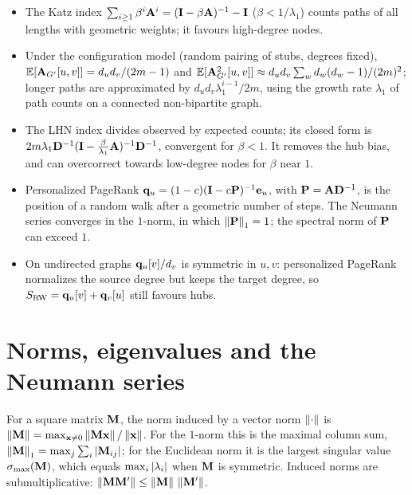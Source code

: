 \begin{notechapter}
\begin{chaptersummary}
\begin{itemize}
\item The Katz index $\sum_{i\ge1}\beta^i\mathbf{A}^i = (\mathbf{I} - \beta\mathbf{A})^{-1} - \mathbf{I}$ ($\beta < 1/\lambda_1$) counts paths of all lengths with geometric weights; it favours high-degree nodes.
\item Under the configuration model (random pairing of stubs, degrees fixed), $\mathbb{E}[\mathbf{A}_{G'}[u,v]] = d_ud_v/(2m-1)$ and $\mathbb{E}[\mathbf{A}_{G'}^2[u,v]] \approx d_ud_v\sum_wd_w(d_w-1)/(2m)^2$; longer paths are approximated by $d_ud_v\lambda_1^{i-1}/2m$, using the growth rate $\lambda_1$ of path counts on a connected non-bipartite graph.
\item The LHN index divides observed by expected counts; its closed form is $2m\lambda_1\mathbf{D}^{-1}(\mathbf{I} - \frac{\beta}{\lambda_1}\mathbf{A})^{-1}\mathbf{D}^{-1}$, convergent for $\beta < 1$. It removes the hub bias, and can overcorrect towards low-degree nodes for $\beta$ near $1$.
\item Personalized PageRank $\mathbf{q}_u = (1-c)(\mathbf{I} - c\mathbf{P})^{-1}\mathbf{e}_u$, with $\mathbf{P} = \mathbf{A}\mathbf{D}^{-1}$, is the position of a random walk after a geometric number of steps. The Neumann series converges in the $1$-norm, in which $\left\|\mathbf{P}\right\|_1 = 1$; the spectral norm of $\mathbf{P}$ can exceed $1$.
\item On undirected graphs $\mathbf{q}_u[v]/d_v$ is symmetric in $u, v$: personalized PageRank normalizes the source degree but keeps the target degree, so $S_{\text{RW}} = \mathbf{q}_u[v] + \mathbf{q}_v[u]$ still favours hubs.
\end{itemize}
\end{chaptersummary}

\chapterappendix

\section{Norms, eigenvalues and the Neumann series}

\begin{definition}\label{node-similarity:def:norms}
For a square matrix $\mathbf{M}$, the norm induced by a vector norm $\left\|\cdot\right\|$ is $\left\|\mathbf{M}\right\| = \max_{\mathbf{x}\ne0}\left\|\mathbf{M}\mathbf{x}\right\|/\left\|\mathbf{x}\right\|$. For the $1$-norm this is the maximal column sum, $\left\|\mathbf{M}\right\|_1 = \max_j\sum_i\left|\mathbf{M}_{ij}\right|$; for the Euclidean norm it is the largest singular value $\sigma_{\max}(\mathbf{M})$, which equals $\max_i\left|\lambda_i\right|$ when $\mathbf{M}$ is symmetric. Induced norms are submultiplicative: $\left\|\mathbf{M}\mathbf{M}'\right\| \le \left\|\mathbf{M}\right\|\,\left\|\mathbf{M}'\right\|$.
\end{definition}


\end{notechapter}
